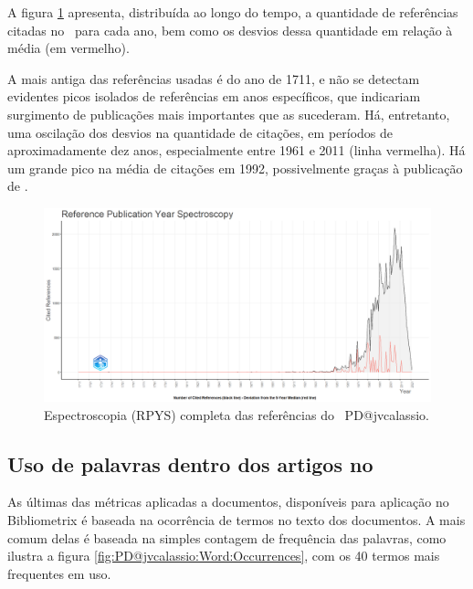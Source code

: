 A figura \ref{fig:PD@jvcalassio:ReferenceSpectroscopy} apresenta, distribuída ao longo do tempo, a quantidade de referências citadas no \dataset\, para cada ano, bem como os desvios dessa quantidade em relação à média (em vermelho). 

A mais antiga das referências usadas é do ano de 1711, e não se detectam evidentes picos isolados de referências em anos específicos, que indicariam surgimento de publicações mais importantes que as sucederam. Há, entretanto, uma oscilação dos desvios na quantidade de citações, em períodos de aproximadamente dez anos, especialmente entre 1961 e 2011 (linha vermelha). Há um grande pico na média de citações em 1992, possivelmente graças à publicação de \citet{poundstone_prisoners_1992}.

\begin{figure}
    \centering
    \includegraphics[width=1\textwidth]{exploratory-data-analysis/jvcalassio/PesqBibliogr/PrisonersDilemma/WoS-20221201/Dataset/ReferenceSpectroscopy-2022-12-03.png}
    \caption{Espectroscopia (RPYS) completa das referências do \dataset\ PD@jvcalassio.}
    \label{fig:PD@jvcalassio:ReferenceSpectroscopy}
\end{figure}

\subsection{Uso de palavras dentro dos artigos no \dataset}

As últimas das métricas aplicadas a documentos, disponíveis para aplicação no Bibliometrix é baseada na ocorrência de termos no texto dos documentos. A mais comum delas é baseada na simples contagem de frequência das palavras, como ilustra a figura \ref{fig:PD@jvcalassio:Word:Occurrences}, com os 40 termos mais frequentes em uso.

